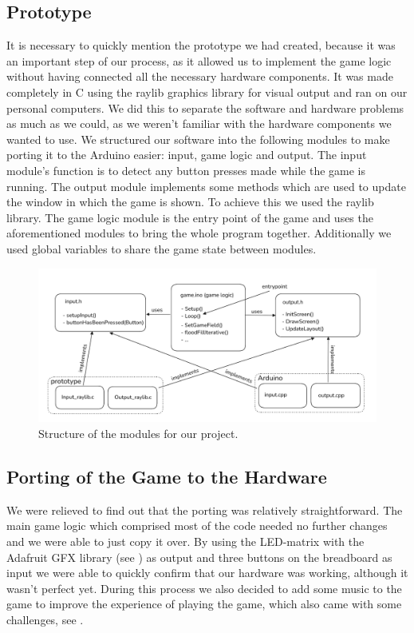 \documentclass[10pt, a4paper]{article}
\begin{document}
\subsection*{Prototype}

It is necessary to quickly mention the prototype we had created, because it was an important step of our process, as it allowed us to implement the game logic without having connected all the necessary hardware components. It was made completely in C using the raylib graphics library for visual output and ran on our personal computers. We did this to separate the software and hardware problems as much as we could, as we weren't familiar with the hardware components we wanted to use. We structured our software into the following modules to make porting it to the Arduino easier: input, game logic and output. The input module's function is to detect any button presses made while the game is running. The output module implements some methods which are used to update the window in which the game is shown. To achieve this we used the raylib library. The game logic module is the entry point of the game and uses the aforementioned modules to bring the whole program together. Additionally we used global variables to share the game state between modules.

\begin{figure}[h]
\centering
\includegraphics[width=\textwidth]{module_structure.png}
\caption{Structure of the modules for our project.}
\end{figure}

\subsection*{Porting of the Game to the Hardware}
We were relieved to find out that the porting was relatively straightforward. The main game logic which comprised most of the code needed no further changes and we were able to just copy it over. By using the LED-matrix with the Adafruit GFX library (see ) as output and three buttons on the breadboard as input we were able to quickly confirm that our hardware was working, although it wasn't perfect yet. During this process we also decided to add some music to the game to improve the experience of playing the game, which also came with some challenges, see .
\end{document}
